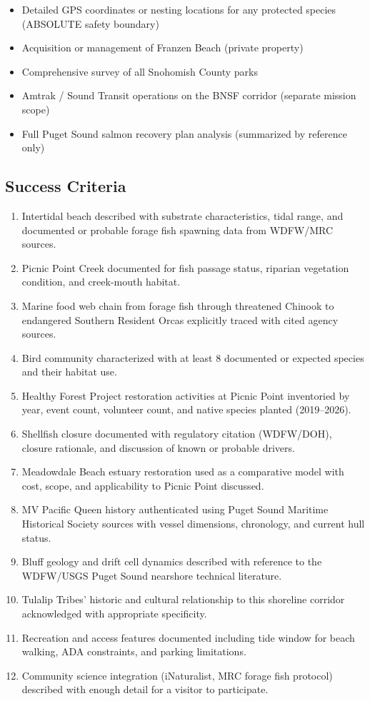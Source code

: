 \documentclass[11pt,letterpaper]{article}
\begin{document}
\begin{itemize}
  \item Detailed GPS coordinates or nesting locations for any protected species (ABSOLUTE safety boundary)
  \item Acquisition or management of Franzen Beach (private property)
  \item Comprehensive survey of all Snohomish County parks
  \item Amtrak / Sound Transit operations on the BNSF corridor (separate mission scope)
  \item Full Puget Sound salmon recovery plan analysis (summarized by reference only)
\end{itemize}

\subsection{Success Criteria}

\begin{enumerate}
  \item Intertidal beach described with substrate characteristics, tidal range, and documented or probable forage fish spawning data from WDFW/MRC sources.
  \item Picnic Point Creek documented for fish passage status, riparian vegetation condition, and creek-mouth habitat.
  \item Marine food web chain from forage fish through threatened Chinook to endangered Southern Resident Orcas explicitly traced with cited agency sources.
  \item Bird community characterized with at least 8 documented or expected species and their habitat use.
  \item Healthy Forest Project restoration activities at Picnic Point inventoried by year, event count, volunteer count, and native species planted (2019--2026).
  \item Shellfish closure documented with regulatory citation (WDFW/DOH), closure rationale, and discussion of known or probable drivers.
  \item Meadowdale Beach estuary restoration used as a comparative model with cost, scope, and applicability to Picnic Point discussed.
  \item MV Pacific Queen history authenticated using Puget Sound Maritime Historical Society sources with vessel dimensions, chronology, and current hull status.
  \item Bluff geology and drift cell dynamics described with reference to the WDFW/USGS Puget Sound nearshore technical literature.
  \item Tulalip Tribes' historic and cultural relationship to this shoreline corridor acknowledged with appropriate specificity.
  \item Recreation and access features documented including tide window for beach walking, ADA constraints, and parking limitations.
  \item Community science integration (iNaturalist, MRC forage fish protocol) described with enough detail for a visitor to participate.
\end{enumerate}
\end{document}
